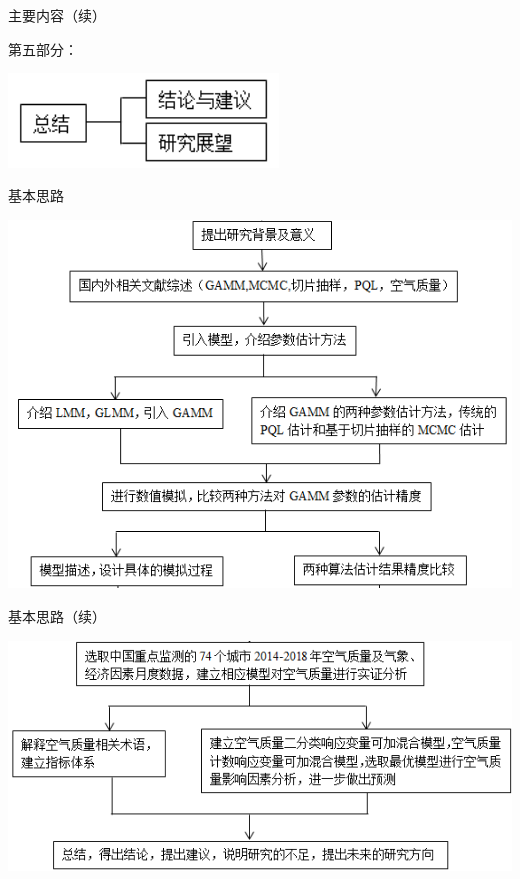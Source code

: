 \documentclass[ignorenonframetext,11pt,xcolor=dvipsnames,aspectratio=1610,hyperref={bookmarksdepth=4}]{beamer}
\begin{document}
\begin{frame}{主要内容（续）}

第五部分：

\includegraphics[width=2.82in]{5}

\end{frame}

\begin{frame}{基本思路}

\includegraphics[width=7.74in]{6_1}

\end{frame}

\begin{frame}{基本思路（续）}

\includegraphics[width=7.9in]{6_2}

\end{frame}
\end{document}
